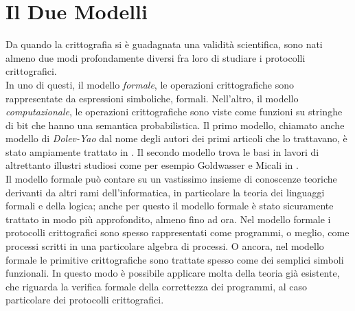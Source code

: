 \documentclass[a4paper,openright,twoside,12pt]{report}
\begin{document}
\section{Il Due Modelli}
Da quando la crittografia si \`e guadagnata una validit\`a scientifica, sono nati almeno due modi profondamente
 diversi fra loro di studiare i protocolli crittografici.\\In uno di questi, il modello \emph{formale}, le operazioni crittografiche sono rappresentate da espressioni simboliche, formali.
Nell'altro, il modello \emph{computazionale}, le operazioni crittografiche sono viste come funzioni su stringhe di bit che hanno una semantica probabilistica.
Il primo modello, chiamato anche modello di \emph{Dolev-Yao} dal nome degli autori dei primi articoli che lo trattavano,
\`e stato ampiamente trattato in \cite{AbadiG99, BurrowsAN90, Kemmerer87, Paulson98}. 
Il secondo modello trova le basi in lavori di altrettanto illustri studiosi come per esempio Goldwasser e Micali in \cite{GoldwasserM84}.\\
Il modello formale pu\`o contare su un vastissimo insieme di conoscenze teoriche derivanti da altri rami dell'informatica, in particolare la teoria dei linguaggi formali e della logica;
anche per questo il modello formale \`e stato sicuramente trattato in modo pi\`u approfondito, almeno fino ad ora. 
Nel modello formale i protocolli crittografici sono spesso rappresentati come programmi, o meglio, come processi scritti
in una particolare algebra di processi. O ancora, nel modello formale le 
primitive crittografiche sono trattate spesso come dei semplici simboli funzionali.
In questo modo \`e possibile applicare molta della teoria gi\`a esistente, 
che riguarda la verifica formale della correttezza dei programmi, al caso particolare dei protocolli crittografici.
\end{document}
